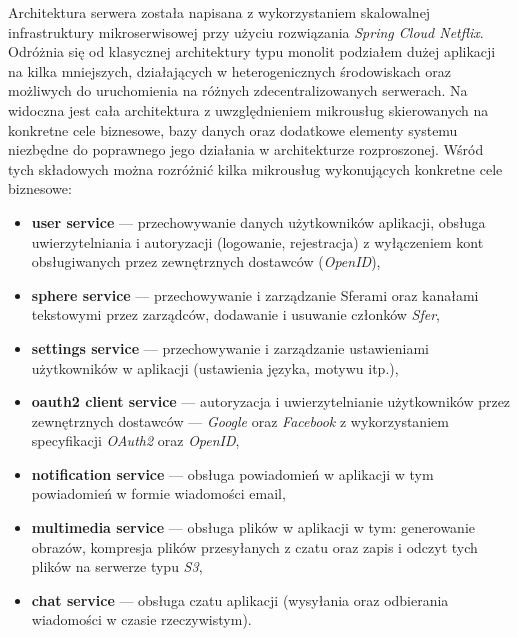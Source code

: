 Architektura serwera została napisana z wykorzystaniem skalowalnej infrastruktury mikroserwisowej przy użyciu
rozwiązania \textit{Spring Cloud Netflix}. Odróżnia się od klasycznej architektury typu monolit podziałem dużej
aplikacji na kilka mniejszych, działających w heterogenicznych środowiskach oraz możliwych do uruchomienia na różnych
zdecentralizowanych serwerach. Na  widoczna jest cała architektura z uwzględnieniem mikrousług
skierowanych na konkretne cele biznesowe, bazy danych oraz dodatkowe elementy systemu niezbędne do poprawnego jego
działania w architekturze rozproszonej. Wśród tych składowych można rozróżnić kilka mikrousług wykonujących konkretne
cele biznesowe:
%
\begin{itemize}
  \item \textbf{user service} — przechowywanie danych użytkowników aplikacji, obsługa uwierzytelniania i autoryzacji
        (logowanie, rejestracja) z wyłączeniem kont obsługiwanych przez zewnętrznych dostawców (\textit{OpenID}),
  \item \textbf{sphere service} — przechowywanie i zarządzanie Sferami oraz kanałami tekstowymi przez zarządców,
        dodawanie i usuwanie członków \textit{Sfer},
  \item \textbf{settings service} — przechowywanie i zarządzanie ustawieniami użytkowników w aplikacji (ustawienia
        języka, motywu itp.),
  \item \textbf{oauth2 client service} — autoryzacja i uwierzytelnianie użytkowników przez zewnętrznych dostawców —
        \textit{Google} oraz \textit{Facebook} z wykorzystaniem specyfikacji \textit{OAuth2} oraz \textit{OpenID},
  \item \textbf{notification service} — obsługa powiadomień w aplikacji w tym powiadomień w formie wiadomości email,
  \item \textbf{multimedia service} — obsługa plików w aplikacji w tym: generowanie obrazów, kompresja plików
        przesyłanych z czatu oraz zapis i odczyt tych plików na serwerze typu \textit{S3},
  \item \textbf{chat service} — obsługa czatu aplikacji (wysyłania oraz odbierania wiadomości w czasie rzeczywistym).
\end{itemize}

